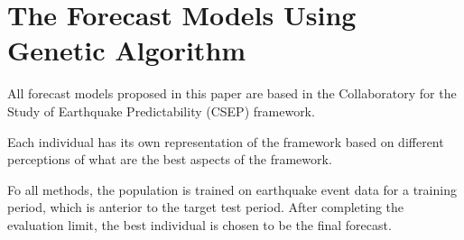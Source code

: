 %	
%
%

\section{The Forecast Models Using Genetic Algorithm}\label{Models}

All forecast models proposed in this paper are based in the
Collaboratory for the Study of Earthquake Predictability (CSEP)
framework.

Each individual has its own representation of the framework based on
different perceptions of what are the best aspects of the framework.

Fo all methods, the population is trained on earthquake event data for a training
period, which is anterior to the target test period. After completing
the evaluation limit, the best individual is chosen to be the final
forecast.

